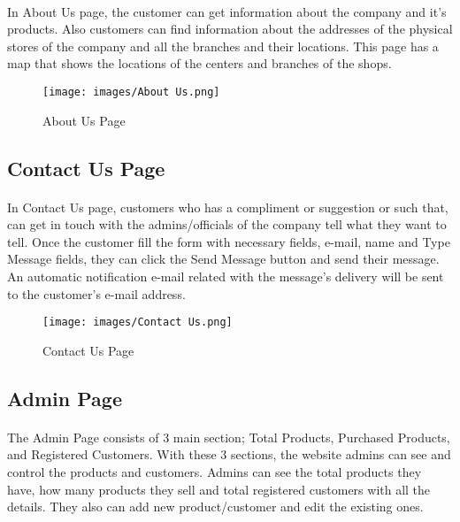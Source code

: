 \documentclass[12pt]{article}
\begin{document}
\paragraph{}
In About Us page, the customer can get information about the company and it's products. Also customers can find information about the addresses of the physical stores of the company and all the branches and their locations. This page has a map that shows the locations of the centers and branches of the shops.
\bigskip
\bigskip
\bigskip
\begin{figure}[h]
\centerline{\texttt{[image: images/About Us.png]}}
\caption{About Us Page}
\label{fig}
\end{figure}


\newpage
\subsection{Contact Us Page}
\bigskip
\paragraph{}
In Contact Us page, customers who has a compliment or suggestion or such that, can get in touch with the admins/officials of the company tell what they want to tell. Once the customer fill the form with necessary fields, e-mail, name and Type Message fields, they can click the Send Message button and send their message. An automatic notification e-mail related with the message's delivery will be sent to the customer's e-mail address. 
\bigskip
\bigskip
\bigskip
\begin{figure}[h]
\centerline{\texttt{[image: images/Contact Us.png]}}
\caption{Contact Us Page}
\label{fig}
\end{figure}

\newpage
\subsection{Admin Page}
\bigskip
\paragraph{}
The Admin Page consists of 3 main section; Total Products, Purchased Products, and Registered Customers. With these 3 sections, the website admins can see and control the products and customers. Admins can see the total products they have, how many products they sell and total registered customers with all the details. They also can add new product/customer and edit the existing ones. 
\end{document}
